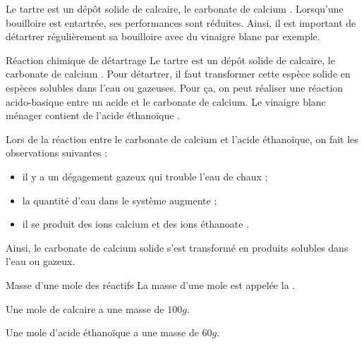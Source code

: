 \sndEnTeteSix
\vspace*{-6pt}
\nomPrenomClasse



\begin{contexte}
  Le tartre est un dépôt solide de calcaire, le carbonate de calcium .
  Lorsqu'une bouilloire est entartrée, ses performances sont réduites.
  Ainsi, il est important de détartrer régulièrement sa bouilloire avec du vinaigre blanc par exemple.
\end{contexte}


\begin{doc}{Réaction chimique de détartrage}
  \label{doc:reaction_detartrage}
  Le tartre est un dépôt solide de calcaire, le carbonate de calcium .
  Pour détartrer, il faut transformer cette espèce solide en espèces solubles dans l'eau ou gazeuses.
  Pour ça, on peut réaliser une réaction acido-basique entre un acide et le carbonate de calcium.
  Le vinaigre blanc ménager contient de l'acide éthanoïque .

  Lors de la réaction entre le carbonate de calcium et l'acide éthanoïque, on fait les observations suivantes :
  \begin{itemize}
    \item il y a un dégagement gazeux qui trouble l'eau de chaux ;
    \item la quantité d'eau dans le système augmente ;
    \item il se produit des ions calcium  et des ions éthanoate .
  \end{itemize}
    
  Ainsi, le carbonate de calcium solide s'est transformé en produits solubles dans l'eau ou gazeux.
\end{doc}

\begin{doc}{Masse d'une mole des réactifs}
  La masse d'une mole est appelée la .

  \begin{donnees}
    \item Une mole de calcaire  a une masse de $100 \unit{g}$.
    \item Une mole d'acide éthanoïque  a une masse de $60 \unit{g}$.
  \end{donnees}
\end{doc}

